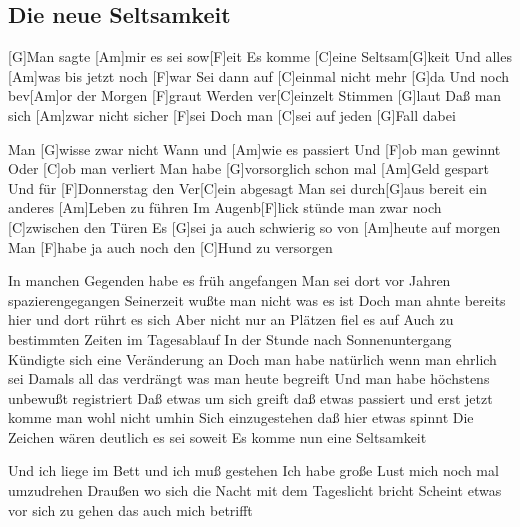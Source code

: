 \subsection*{Die neue Seltsamkeit   }


\begin{guitar}


[G]Man sagte [Am]mir es sei sow[F]eit
Es komme [C]eine Seltsam[G]keit
Und alles [Am]was bis jetzt noch [F]war
Sei dann auf [C]einmal nicht mehr [G]da
Und noch bev[Am]or der Morgen [F]graut
Werden ver[C]einzelt Stimmen [G]laut
Daß man sich [Am]zwar nicht sicher [F]sei
Doch man [C]sei auf jeden [G]Fall dabei


Man [G]wisse zwar nicht
Wann und [Am]wie es passiert
Und [F]ob man gewinnt
Oder [C]ob man verliert
Man habe [G]vorsorglich schon mal [Am]Geld gespart
Und für [F]Donnerstag den Ver[C]ein abgesagt
Man sei durch[G]aus bereit ein anderes [Am]Leben zu führen
Im Augenb[F]lick stünde man zwar noch [C]zwischen den Türen
Es [G]sei ja auch schwierig so von [Am]heute auf morgen
Man [F]habe ja auch noch den [C]Hund zu versorgen


In manchen Gegenden habe es früh angefangen
Man sei dort vor Jahren spazierengegangen
Seinerzeit wußte man nicht was es ist
Doch man ahnte bereits hier und dort rührt es sich
Aber nicht nur an Plätzen fiel es auf
Auch zu bestimmten Zeiten im Tagesablauf
In der Stunde nach Sonnenuntergang
Kündigte sich eine Veränderung an
Doch man habe natürlich wenn man ehrlich sei
Damals all das verdrängt was man heute begreift
Und man habe höchstens unbewußt registriert
Daß etwas um sich greift daß etwas passiert
und erst jetzt komme man wohl nicht umhin
Sich einzugestehen daß hier etwas spinnt
Die Zeichen wären deutlich es sei soweit
Es komme nun eine Seltsamkeit


Und ich liege im Bett und ich muß gestehen
Ich habe große Lust mich noch mal umzudrehen
Draußen wo sich die Nacht mit dem Tageslicht bricht
Scheint etwas vor sich zu gehen das auch mich betrifft
\end{guitar}
